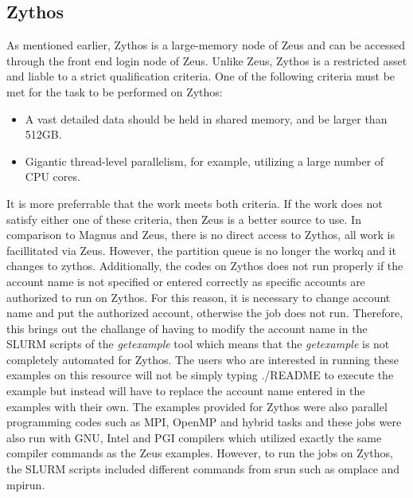 \subsection{Zythos}
As mentioned earlier, Zythos is a large-memory node of Zeus and can be accessed through the front end login node of Zeus. Unlike Zeus, Zythos is a 
restricted asset and liable to a strict qualification criteria. One of the following criteria must be met for the task to be performed on Zythos:

\begin{itemize}
\item A vast detailed data should be held in shared memory, and be larger than 512GB.
\item Gigantic thread-level parallelism, for example, utilizing a large number of CPU cores.
\end{itemize}

It is more preferrable that the work meets both criteria. If the work does not satisfy either one of these criteria, then Zeus is a better source to
use. In comparison to  Magnus and Zeus, there is no direct access to Zythos, all work is facillitated via Zeus. However, the partition queue is no longer
the workq and it changes to zythos. Additionally, the codes on Zythos does not run properly if the account name is not specified or 
entered correctly as specific accounts are authorized to run on Zythos. For this reason, it is necessary to change account name and put the authorized 
account, otherwise the job does not run. Therefore, this brings out the challange of having to modify the account name in the SLURM scripts of the 
\emph{getexample} tool which means that the \emph{getexample} is not completely automated for Zythos. The users who are interested in running these 
examples on this resource will not be simply typing ./README to execute the example but instead will have to replace the account name entered in the 
examples with their own. The examples provided for Zythos were also parallel programming codes such as MPI, OpenMP and hybrid tasks and these jobs were 
also run with GNU, Intel and PGI compilers which utilized exactly the same compiler commands as the Zeus examples. However, to run the jobs on Zythos, 
the SLURM scripts included different commands from srun such as omplace and mpirun. 

